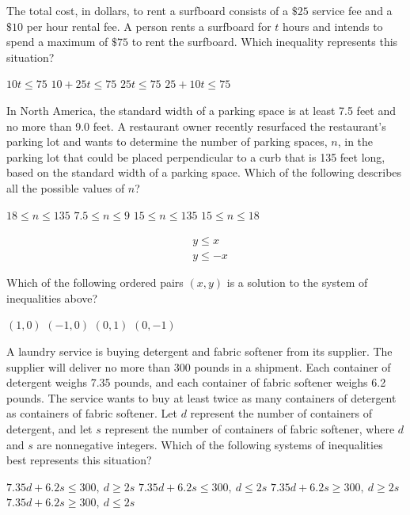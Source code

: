 \newpage


\question[1]
The total cost, in dollars, to rent a surfboard consists of a $\$ 25$ service fee and a $\$ 10$ per hour rental fee. A person rents a surfboard for $t$ hours and intends to spend a maximum of $\$ 75$ to rent the surfboard. Which inequality represents this situation?
\begin{choices}
  \choice $10t \leq 75$
  \choice $10 + 25t \leq 75$
  \choice $25t \leq 75$
  \CorrectChoice $25 + 10t \leq 75$
\end{choices}

\question[1]
In North America, the standard width of a parking space is at least 7.5 feet and no more than 9.0 feet. A restaurant owner recently resurfaced the restaurant's parking lot and wants to determine the number of parking spaces, $n$, in the parking lot that could be placed perpendicular to a curb that is 135 feet long, based on the standard width of a parking space. Which of the following describes all the possible values of $n$?
\begin{choices}
  \choice $18 \leq n \leq 135$
  \choice $7.5 \leq n \leq 9$
  \choice $15 \leq n \leq 135$
  \CorrectChoice $15 \leq n \leq 18$
\end{choices}



\question[1]
$$
\begin{aligned}
& y \leq x \\
& y \leq -x
\end{aligned}
$$

Which of the following ordered pairs $(x, y)$ is a solution to the system of inequalities above?
\begin{choices}
  \choice $(1,0)$
  \choice $(-1,0)$
  \choice $(0,1)$
  \CorrectChoice $(0,-1)$
\end{choices}


\newpage

\question[1]
A laundry service is buying detergent and fabric softener from its supplier. The supplier will deliver no more than 300 pounds in a shipment. Each container of detergent weighs 7.35 pounds, and each container of fabric softener weighs 6.2 pounds. The service wants to buy at least twice as many containers of detergent as containers of fabric softener. Let $d$ represent the number of containers of detergent, and let $s$ represent the number of containers of fabric softener, where $d$ and $s$ are nonnegative integers. Which of the following systems of inequalities best represents this situation?
\begin{choices}
  \CorrectChoice $7.35d + 6.2s \leq 300,\ d \geq 2s$
  \choice $7.35d + 6.2s \leq 300,\ d \leq 2s$
  \choice $7.35d + 6.2s \geq 300,\ d \geq 2s$
  \choice $7.35d + 6.2s \geq 300,\ d \leq 2s$
\end{choices}


